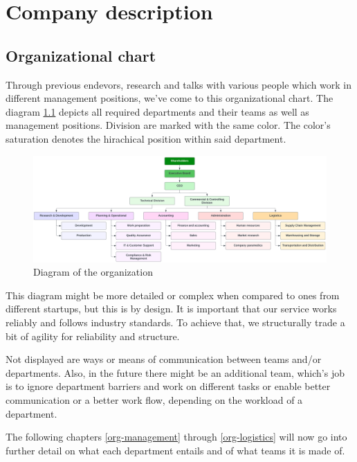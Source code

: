 \chapter{Company description}
\section{Organizational chart}\label{org-chart}
Through previous endevors, research and talks with various people which work in different management positions, we've come to this organizational chart. The diagram \ref{fig:organisational-chart} depicts all required departments and their teams as well as management positions. Division are marked with the same color. The color's saturation denotes the hirachical position within said department.

\begin{figure}[!ht]
  \centering
  \includegraphics[width=\linewidth]{./images/organisational-chart.png}
  \caption[Organizational chart made with lucidchart.com]{Diagram of the organization}
  \label{fig:organisational-chart}
\end{figure}

This diagram might be more detailed or complex when compared to ones from different startups, but this is by design. It is important that our service works reliably and follows industry standards. To achieve that, we structurally trade a bit of agility for reliability and structure.

Not displayed are ways or means of communication between teams and/or departments. Also, in the future there might be an additional team, which's job is to ignore department barriers and work on different tasks or enable better communication or a better work flow, depending on the workload of a department.

The following chapters \ref{org-management} through \ref{org-logistics} will now go into further detail on what each department entails and of what teams it is made of.
